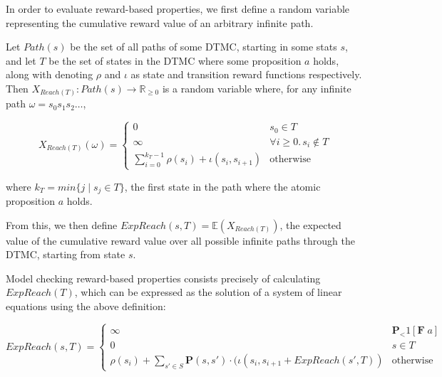 In order to evaluate reward-based properties, we first define a random variable representing the cumulative reward value of an arbitrary infinite path.

\begin{definition}
\label{back:reach_reward}

Let $Path(s)$ be the set of all paths of some DTMC, starting in some stats $s$, and let $T$ be the set of states in the DTMC where some proposition $a$ holds, along with denoting $\rho$ and $\iota$ as state and transition reward functions respectively. Then $X_{Reach(T)} : Path(s) \rightarrow \mathbb{R}_{\geq 0}$ is a random variable where, for any infinite path $\omega = s_{0} s_{1} s_{2} \dots$,

    \begin{equation*} 
        X_{Reach(T)}(\omega) = 
            \begin{cases}
                0 & s_0 \in T \\
                \infty & \forall i \geq 0 . \, s_i \notin T  \\
                \sum_{i=0}^{k_{T} - 1} \rho(s_i) + \iota(s_i, s_{i+1}) & \text{otherwise}
            \end{cases}
    \end{equation*}

where $k_T = min \{ j \mid s_j \in T \}$, the first state in the path where the atomic proposition $a$ holds.

From this, we then define $ExpReach(s, T) = \mathbb{E}(X_{Reach(T)})$, the expected value of the cumulative reward value over all possible infinite paths through the DTMC, starting from state $s$.

\end{definition}

Model checking reward-based properties consists precisely of calculating $ExpReach(T)$, which can be expressed as the solution of a system of linear equations using the above definition:

\begin{equation*}
    ExpReach(s, T) = 
        \begin{cases}
            \infty & \mathbf{P}_<1 [\mathbf{F} \; a] \\ 
            0 & s \in T \\
            \rho(s_i) + \sum_{s' \in S} \mathbf{P}(s, s') \cdot (\iota(s_i, s_{i+1} + ExpReach(s', T)) & \text{otherwise}
        \end{cases}
\end{equation*}

